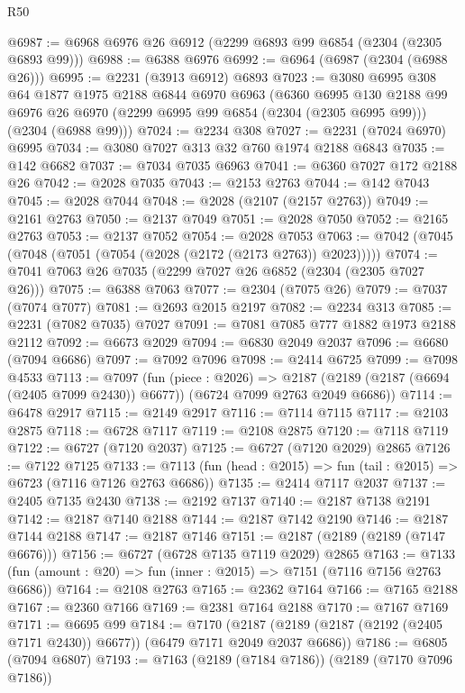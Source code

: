 \begin{lexlean}{R50}
\begin{coremodule}
@6987 := @6968 @6976 @26 @6912 (@2299 @6893 @99 @6854 (@2304 (@2305 @6893 @99)))
@6988 := @6388 @6976
@6992 := @6964 (@6987 (@2304 (@6988 @26)))
@6995 := @2231 (@3913 @6912) @6893
@7023 := @3080
    @6995
    @308
    @64
    @1877
    @1975
    @2188
    @6844
    @6970
    @6963
    (@6360
      @6995
      @130
      @2188
      @99
      @6976
      @26
      @6970
      (@2299 @6995 @99 @6854 (@2304 (@2305 @6995 @99)))
      (@2304 (@6988 @99)))
@7024 := @2234 @308
@7027 := @2231 (@7024 @6970) @6995
@7034 := @3080 @7027 @313 @32 @760 @1974 @2188 @6843
@7035 := @142 @6682
@7037 := @7034 @7035 @6963
@7041 := @6360 @7027 @172 @2188 @26
@7042 := @2028 @7035
@7043 := @2153 @2763
@7044 := @142 @7043
@7045 := @2028 @7044
@7048 := @2028 (@2107 (@2157 @2763))
@7049 := @2161 @2763
@7050 := @2137 @7049
@7051 := @2028 @7050
@7052 := @2165 @2763
@7053 := @2137 @7052
@7054 := @2028 @7053
@7063 := @7042 (@7045 (@7048 (@7051 (@7054 (@2028 (@2172 (@2173 @2763)) @2023)))))
@7074 := @7041 @7063 @26 @7035 (@2299 @7027 @26 @6852 (@2304 (@2305 @7027 @26)))
@7075 := @6388 @7063
@7077 := @2304 (@7075 @26)
@7079 := @7037 (@7074 @7077)
@7081 := @2693 @2015 @2197
@7082 := @2234 @313
@7085 := @2231 (@7082 @7035) @7027
@7091 := @7081 @7085 @777 @1882 @1973 @2188 @2112
@7092 := @6673 @2029
@7094 := @6830 @2049 @2037
@7096 := @6680 (@7094 @6686)
@7097 := @7092 @7096
@7098 := @2414 @6725
@7099 := @7098 @4533
@7113 := @7097
    (fun (piece : @2026) =>
    @2187 (@2189 (@2187 (@6694 (@2405 @7099 @2430)) @6677)) (@6724 @7099 @2763 @2049 @6686))
@7114 := @6478 @2917
@7115 := @2149 @2917
@7116 := @7114 @7115
@7117 := @2103 @2875
@7118 := @6728 @7117
@7119 := @2108 @2875
@7120 := @7118 @7119
@7122 := @6727 (@7120 @2037)
@7125 := @6727 (@7120 @2029) @2865
@7126 := @7122 @7125
@7133 := @7113 (fun (head : @2015) => fun (tail : @2015) => @6723 (@7116 @7126 @2763 @6686))
@7135 := @2414 @7117 @2037
@7137 := @2405 @7135 @2430
@7138 := @2192 @7137
@7140 := @2187 @7138 @2191
@7142 := @2187 @7140 @2188
@7144 := @2187 @7142 @2190
@7146 := @2187 @7144 @2188
@7147 := @2187 @7146
@7151 := @2187 (@2189 (@2189 (@7147 @6676)))
@7156 := @6727 (@6728 @7135 @7119 @2029) @2865
@7163 := @7133 (fun (amount : @20) => fun (inner : @2015) => @7151 (@7116 @7156 @2763 @6686))
@7164 := @2108 @2763
@7165 := @2362 @7164
@7166 := @7165 @2188
@7167 := @2360 @7166
@7169 := @2381 @7164 @2188
@7170 := @7167 @7169
@7171 := @6695 @99
@7184 := @7170
    (@2187 (@2189 (@2187 (@2192 (@2405 @7171 @2430)) @6677)) (@6479 @7171 @2049 @2037 @6686))
@7186 := @6805 (@7094 @6807)
@7193 := @7163 (@2189 (@7184 @7186)) (@2189 (@7170 @7096 @7186))

\end{coremodule}
\end{lexlean}
